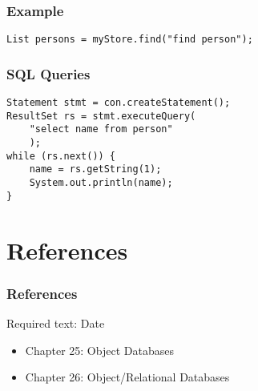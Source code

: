 \documentclass[dvipsnames]{beamer}
\theoremstyle{plain}
\begin{document}
\begin{frame}[fragile]
  \frametitle{Example}

  \begin{example}
    \begin{lstlisting}
List persons = myStore.find("find person");
    \end{lstlisting}
  \end{example}
\end{frame}

\begin{frame}[fragile]
  \frametitle{SQL Queries}

  \begin{example}
    \begin{lstlisting}
Statement stmt = con.createStatement();
ResultSet rs = stmt.executeQuery(
    "select name from person"
    );
while (rs.next()) {
    name = rs.getString(1);
    System.out.println(name);
}
    \end{lstlisting}
  \end{example}
\end{frame}


\section*{References}

\begin{frame}
  \frametitle{References}

  \begin{block}{Required text: Date}
    \begin{itemize}
      \item Chapter 25: \alert{Object Databases}
      \item Chapter 26: \alert{Object/Relational Databases}
    \end{itemize}
  \end{block}
\end{frame}
\end{document}
